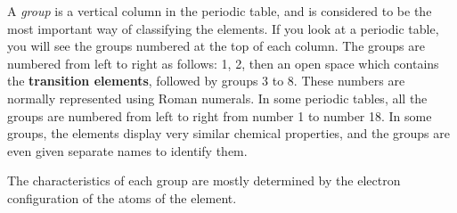 A \textit{group} is a vertical column in the periodic table, and is considered to be the most important way of classifying the elements. If you look at a periodic table, you will see the groups numbered at the top of each column. The groups are numbered from left to right as follows: 1, 2, then an open space which contains the \textbf{transition elements}, followed by groups 3 to 8. These numbers are normally represented using Roman numerals. In some periodic tables, all the groups are numbered from left to right from number 1 to number 18. In some groups, the elements display very similar chemical properties, and the groups are even given separate names to identify them. 

The characteristics of each group are mostly determined by the electron configuration of the atoms of the element. 

